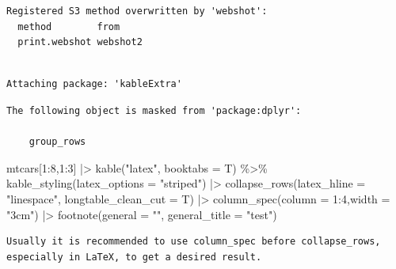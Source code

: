 \documentclass[
  letterpaper,
  DIV=11,
  numbers=noendperiod]{scrartcl}
\newenvironment{Shaded}{\begin{snugshade}}{\end{snugshade}}
\newcommand{\AttributeTok}[1]{\textcolor[rgb]{0.40,0.45,0.13}{#1}}
\newcommand{\DecValTok}[1]{\textcolor[rgb]{0.68,0.00,0.00}{#1}}
\newcommand{\FunctionTok}[1]{\textcolor[rgb]{0.28,0.35,0.67}{#1}}
\newcommand{\NormalTok}[1]{\textcolor[rgb]{0.00,0.23,0.31}{#1}}
\newcommand{\SpecialCharTok}[1]{\textcolor[rgb]{0.37,0.37,0.37}{#1}}
\newcommand{\StringTok}[1]{\textcolor[rgb]{0.13,0.47,0.30}{#1}}
\begin{document}
\begin{verbatim}
Registered S3 method overwritten by 'webshot':
  method        from    
  print.webshot webshot2
\end{verbatim}

\begin{verbatim}

Attaching package: 'kableExtra'
\end{verbatim}

\begin{verbatim}
The following object is masked from 'package:dplyr':

    group_rows
\end{verbatim}

\begin{Shaded}
\begin{Highlighting}[]
\NormalTok{mtcars[}\DecValTok{1}\SpecialCharTok{:}\DecValTok{8}\NormalTok{,}\DecValTok{1}\SpecialCharTok{:}\DecValTok{3}\NormalTok{] }\SpecialCharTok{|\textgreater{}} 
  \FunctionTok{kable}\NormalTok{(}\StringTok{"latex"}\NormalTok{, }\AttributeTok{booktabs =}\NormalTok{ T) }\SpecialCharTok{\%\textgreater{}\%}
  \FunctionTok{kable\_styling}\NormalTok{(}\AttributeTok{latex\_options =} \StringTok{"striped"}\NormalTok{) }\SpecialCharTok{|\textgreater{}} 
  \FunctionTok{collapse\_rows}\NormalTok{(}\AttributeTok{latex\_hline =} \StringTok{"linespace"}\NormalTok{,}
                \AttributeTok{longtable\_clean\_cut =}\NormalTok{ T) }\SpecialCharTok{|\textgreater{}} 
  \FunctionTok{column\_spec}\NormalTok{(}\AttributeTok{column =} \DecValTok{1}\SpecialCharTok{:}\DecValTok{4}\NormalTok{,}\AttributeTok{width =} \StringTok{"3cm"}\NormalTok{) }\SpecialCharTok{|\textgreater{}} 
  \FunctionTok{footnote}\NormalTok{(}\AttributeTok{general =} \StringTok{""}\NormalTok{,}
           \AttributeTok{general\_title =} \StringTok{"test"}\NormalTok{)}
\end{Highlighting}
\end{Shaded}

\begin{verbatim}
Usually it is recommended to use column_spec before collapse_rows, especially in LaTeX, to get a desired result. 
\end{verbatim}
\end{document}
